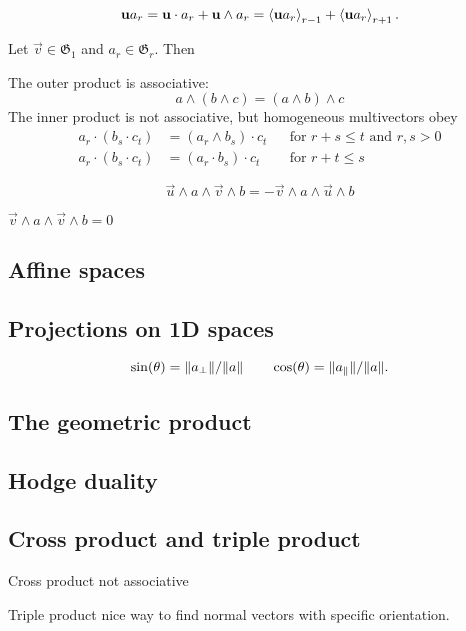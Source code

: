 \begin{lemma}
\[ \boldsymbol{\mathrm{u}}a_r = \boldsymbol{\mathrm{u}}\cdot a_r + \boldsymbol{\mathrm{u}}\wedge a_r = \left\langle \boldsymbol{\mathrm{u}}a_r \right\rangle_{r-1} + \left\langle \boldsymbol{\mathrm{u}}a_r \right\rangle_{r+1}. \]
\end{lemma}

\begin{proposition}
Let $\vec{v}\in\mathfrak{G}_1$ and $a_r\in\mathfrak{G}_r$. Then

\end{proposition}





\begin{lemma}
The outer product is associative:
\[ a\wedge(b\wedge c) = (a\wedge b)\wedge c \]
The inner product is not associative, but homogeneous multivectors obey
\begin{align*}
a_r\cdot(b_s \cdot c_t) &= (a_r\wedge b_s)\cdot c_t & &\text{for $r+s\leq t$ and $r,s>0$} \\
a_r\cdot(b_s \cdot c_t) &= (a_r\cdot b_s)\cdot c_t & &\text{for $r+t\leq s$}
\end{align*}
\end{lemma}

\begin{lemma}
\[ \vec{u}\wedge a\wedge \vec{v}\wedge b = -\vec{v}\wedge a\wedge \vec{u}\wedge b  \]
\end{lemma}
$\vec{v}\wedge a \wedge \vec{v} \wedge b = 0$

\subsection{Affine spaces}
\subsection{Projections on 1D spaces}
\[ \sin(\theta) = \lVert a_\perp\rVert/ \lVert a\rVert \qquad \cos(\theta) = \lVert a_\parallel\rVert/\lVert a\rVert. \]
\subsection{The geometric product}

\subsection{Hodge duality}
\subsection{Cross product and triple product}
Cross product not associative

Triple product nice way to find normal vectors with specific orientation.